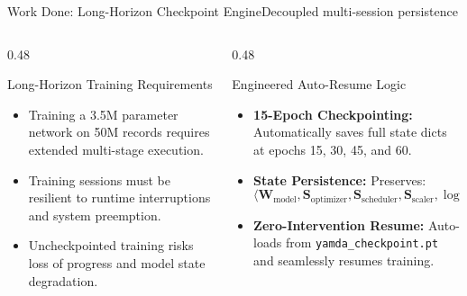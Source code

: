 \documentclass[aspectratio=169,10pt]{beamer}
\begin{document}
\begin{frame}{Work Done: Long-Horizon Checkpoint Engine}{Decoupled multi-session persistence}
    \begin{columns}[T]
        \begin{column}{0.48\textwidth}
            \begin{block}{Long-Horizon Training Requirements}
                \begin{itemize}\small
                    \item Training a 3.5M parameter network on 50M records requires extended multi-stage execution.
                    \item Training sessions must be resilient to runtime interruptions and system preemption.
                    \item Uncheckpointed training risks loss of progress and model state degradation.
                \end{itemize}
            \end{block}
        \end{column}

        \begin{column}{0.48\textwidth}
            \begin{exampleblock}{Engineered Auto-Resume Logic}
                \begin{itemize}\small
                    \item \textbf{15-Epoch Checkpointing:} Automatically saves full state dicts at epochs 15, 30, 45, and 60.
                    \item \textbf{State Persistence:} Preserves:
                    $$\langle \mathbf{W}_{\text{model}}, \mathbf{S}_{\text{optimizer}}, \mathbf{S}_{\text{scheduler}}, \mathbf{S}_{\text{scaler}}, \log \tau \rangle$$
                    \item \textbf{Zero-Intervention Resume:} Auto-loads from \texttt{yamda\_checkpoint.pt} and seamlessly resumes training.
                \end{itemize}
            \end{exampleblock}
        \end{column}
    \end{columns}
\end{frame}
\end{document}
